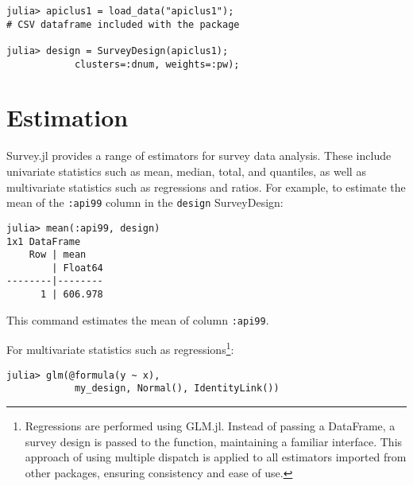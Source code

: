 \documentclass{juliacon}
\begin{document}
\begin{lstlisting}
julia> apiclus1 = load_data("apiclus1"); 
# CSV dataframe included with the package

julia> design = SurveyDesign(apiclus1); 
            clusters=:dnum, weights=:pw);
    \end{lstlisting}


\section{Estimation}

Survey.jl provides a range of estimators for survey data analysis. These include univariate statistics such as mean, median, total, and quantiles, as well as multivariate statistics such as regressions and ratios. For example, to estimate the mean of the \verb|:api99| column in the \verb|design| SurveyDesign:

\begin{lstlisting}
julia> mean(:api99, design)
1x1 DataFrame
    Row | mean    
        | Float64 
--------|--------
      1 | 606.978
    \end{lstlisting}
This command estimates the mean of column \verb|:api99|.

For multivariate statistics such as regressions\footnote{Regressions are performed using GLM.jl. Instead of passing a DataFrame, a survey design is passed to the function, maintaining a familiar interface. This approach of using multiple dispatch is applied to all estimators imported from other packages, ensuring consistency and ease of use.}:

\begin{lstlisting}
julia> glm(@formula(y ~ x),
            my_design, Normal(), IdentityLink())
\end{lstlisting}
\end{document}
